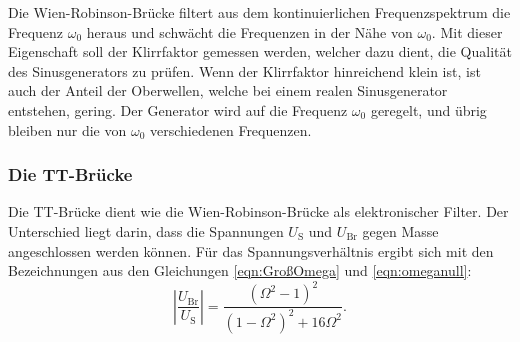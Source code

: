         Die Wien-Robinson-Brücke filtert aus dem kontinuierlichen Frequenzspektrum die Frequenz $\omega_0$ heraus
        und schwächt die Frequenzen in der Nähe von $\omega_0$.
        Mit dieser Eigenschaft soll der Klirrfaktor gemessen werden, welcher dazu dient, die Qualität des
        Sinusgenerators zu prüfen.
        Wenn der Klirrfaktor hinreichend klein ist, ist auch der Anteil der Oberwellen, welche bei einem
        realen Sinusgenerator entstehen, gering.
        Der Generator wird auf die Frequenz $\omega_0$ geregelt, und übrig bleiben nur die von $\omega_0$
        verschiedenen Frequenzen.

    \subsubsection{Die TT-Brücke}

        Die TT-Brücke dient wie die Wien-Robinson-Brücke als elektronischer Filter.
        Der Unterschied liegt darin, dass die Spannungen $U_\text{S}$ und $U_\text{Br}$ gegen Masse
        angeschlossen werden können.
        Für das Spannungsverhältnis ergibt sich mit den Bezeichnungen
        aus den Gleichungen \eqref{eqn:GroßOmega} und \eqref{eqn:omeganull}:
        \begin{equation}
            \left\lvert \frac{U_\text{Br}}{U_\text{S}} \right\rvert = \frac{(\Omega^2 - 1)^2}{(1 - \Omega^2)^2 + 16\Omega^2}.
        \end{equation}
